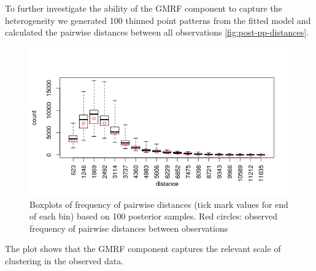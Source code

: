 \documentclass[preprint,12pt]{elsarticle}
\begin{document}
To further investigate the ability of the GMRF component to capture the heterogeneity we generated 100 thinned point patterns from the fitted model and calculated the pairwise distances between all observations \autoref{fig:post-pp-distances}.  
\begin{figure}[h]
	\includegraphics[scale=0.6]{figures/post_pp_distances.png}
	\caption{Boxplots of frequency of pairwise distances (tick mark values for end of each bin) based on 100 posterior samples.  Red circles: observed frequency of pairwise distances between observations}
	\label{fig:post-pp-distances}
\end{figure}
The plot shows that the GMRF component captures the relevant scale of clustering in the observed data.
\end{document}
